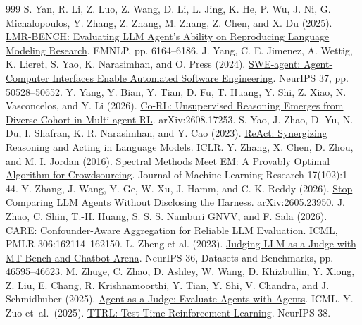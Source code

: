 \documentclass[12pt,letterpaper]{article}
\begin{document}
\begin{thebibliography}{999}
 S. Yan, R. Li, Z. Luo, Z. Wang, D. Li, L. Jing, K. He, P. Wu, J. Ni, G. Michalopoulos, Y. Zhang, Z. Zhang, M. Zhang, Z. Chen, and X. Du (2025). \href{https://doi.org/10.18653/v1/2025.emnlp-main.314}{LMR-BENCH: Evaluating LLM Agent's Ability on Reproducing Language Modeling Research}. EMNLP, pp. 6164--6186.
 J. Yang, C. E. Jimenez, A. Wettig, K. Lieret, S. Yao, K. Narasimhan, and O. Press (2024). \href{https://papers.neurips.cc/paper_files/paper/2024/hash/5a7c947568c1b1328ccc5230172e1e7c-Abstract-Conference.html}{SWE-agent: Agent-Computer Interfaces Enable Automated Software Engineering}. NeurIPS 37, pp. 50528--50652.
 Y. Yang, Y. Bian, Y. Tian, D. Fu, T. Huang, Y. Shi, Z. Xiao, N. Vasconcelos, and Y. Li (2026). \href{https://arxiv.org/abs/2608.17253}{Co-RL: Unsupervised Reasoning Emerges from Diverse Cohort in Multi-agent RL}. arXiv:2608.17253.
 S. Yao, J. Zhao, D. Yu, N. Du, I. Shafran, K. R. Narasimhan, and Y. Cao (2023). \href{https://openreview.net/forum?id=WE_vluYUL-X}{ReAct: Synergizing Reasoning and Acting in Language Models}. ICLR.
 Y. Zhang, X. Chen, D. Zhou, and M. I. Jordan (2016). \href{https://jmlr.org/papers/v17/14-511.html}{Spectral Methods Meet EM: A Provably Optimal Algorithm for Crowdsourcing}. Journal of Machine Learning Research 17(102):1--44.
 Y. Zhang, J. Wang, Y. Ge, W. Xu, J. Hamm, and C. K. Reddy (2026). \href{https://arxiv.org/abs/2605.23950}{Stop Comparing LLM Agents Without Disclosing the Harness}. arXiv:2605.23950.
 J. Zhao, C. Shin, T.-H. Huang, S. S. S. Namburi GNVV, and F. Sala (2026). \href{https://proceedings.mlr.press/v306/zhao26aq.html}{CARE: Confounder-Aware Aggregation for Reliable LLM Evaluation}. ICML, PMLR 306:162114--162150.
 L. Zheng et al. (2023). \href{https://proceedings.neurips.cc/paper_files/paper/2023/hash/91f18a1287b398d378ef22505bf41832-Abstract.html}{Judging LLM-as-a-Judge with MT-Bench and Chatbot Arena}. NeurIPS 36, Datasets and Benchmarks, pp. 46595--46623.
 M. Zhuge, C. Zhao, D. Ashley, W. Wang, D. Khizbullin, Y. Xiong, Z. Liu, E. Chang, R. Krishnamoorthi, Y. Tian, Y. Shi, V. Chandra, and J. Schmidhuber (2025). \href{https://arxiv.org/abs/2410.10934}{Agent-as-a-Judge: Evaluate Agents with Agents}. ICML.
 Y. Zuo et~al.\ (2025). \href{https://openreview.net/forum?id=VuVhgEiu20}{TTRL: Test-Time Reinforcement Learning}. NeurIPS 38.
\end{thebibliography}
\endgroup
\end{document}

